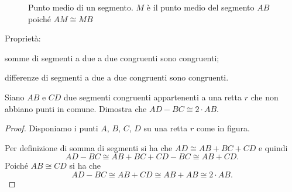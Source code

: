 \begin{figure}[htb]
\centering
\caption{Punto medio di un segmento. $M$ è il punto medio del segmento $AB$ poiché $AM\cong MB$}
\end{figure}

Proprietà:
\begin{itemize*}
\item somme di segmenti a due a due congruenti sono congruenti; 
\item differenze di segmenti a due a due congruenti sono congruenti.
\end{itemize*}

\begin{exrig}
\begin{esempio}
Siano $AB$ e $CD$ due segmenti congruenti appartenenti a una retta $r$ che non abbiano punti in comune. Dimostra che $AD-BC\cong 2\cdot AB$.
\begin{proof}
Disponiamo i punti $A$, $B$, $C$, $D$ su una retta $r$ come in figura.
\begin{figure}[htb]
\centering
\end{figure}

Per definizione di somma di segmenti si ha che $AD\cong AB+BC+CD$ e quindi
\[AD-BC\cong AB+BC+CD-BC\cong AB+CD.\]
Poiché $AB\cong CD$ si ha che
\[AD-BC\cong AB+CD\cong AB+AB\cong 2\cdot AB.\]
\end{proof}
\end{esempio}
\end{exrig}


